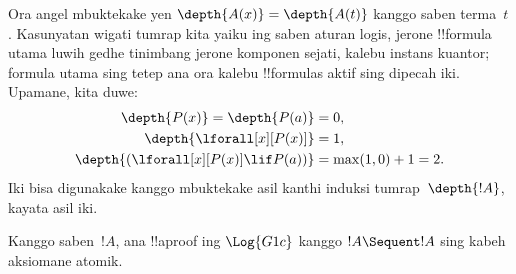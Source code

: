 \documentclass[../../../include/open-logic-section]{subfiles}
\begin{document}
Ora angel mbuktekake yen $\depth{A(x)} = \depth{A(t)}$ kanggo
saben terma~$t$. Kasunyatan wigati tumrap kita yaiku ing saben
aturan logis, jerone !!{formula} utama luwih gedhe tinimbang
jerone komponen sejati, kalebu instans kuantor; formula utama
sing tetep ana ora kalebu !!{formula}s aktif sing dipecah iki.
Upamane, kita duwe:
\begin{align*}
\depth{P(x)} = \depth{P(a)} & = 0,\\
\depth{\lforall[x][P(x)]} & = 1,\\
\depth{(\lforall[x][P(x)] \lif P(a))} & = \max(1,0) + 1 = 2.
\end{align*}
Iki bisa digunakake kanggo mbuktekake asil kanthi induksi
tumrap~$\depth{!A}$, kayata asil iki.

\begin{prop}
Kanggo saben~$!A$, ana !!a{proof} ing $\Log{G1c}$ kanggo
$!A \Sequent !A$ sing kabeh aksiomane atomik.
\end{prop}
\end{document}
